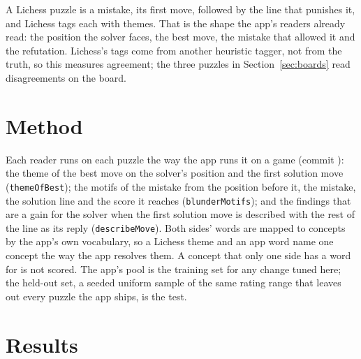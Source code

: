 \documentclass[11pt]{article}
\begin{document}
A Lichess puzzle is a mistake, its first move, followed by the line that punishes it, and
Lichess tags each with themes. That is the shape the app's readers already read: the position
the solver faces, the best move, the mistake that allowed it and the refutation. Lichess's tags
come from another heuristic tagger, not from the truth, so this measures agreement; the three
puzzles in Section~\ref{sec:boards} read disagreements on the board.

\section{Method}

Each reader runs on each puzzle the way the app runs it on a game (commit
\texttt{\AppCommit}): the theme of the best move on the solver's position and the first
solution move (\texttt{themeOfBest}); the motifs of the mistake from the position before it,
the mistake, the solution line and the score it reaches (\texttt{blunderMotifs}); and the
findings that are a gain for the solver when the first solution move is described with the rest
of the line as its reply (\texttt{describeMove}). Both sides' words are mapped to concepts by the
app's own vocabulary, so a Lichess theme and an app word name one concept the way the app
resolves them. A concept that only one side has a word for is not scored. The app's pool is the
training set for any change tuned here; the held-out set, a seeded uniform sample of the same
rating range that leaves out every puzzle the app ships, is the test.

\section{Results}

\begin{table}[tbp]
\centering
\small
\TableBest
\caption{The misses deck's labeller (\texttt{themeOfBest}). Tagged: puzzles Lichess tags with
the concept; said: puzzles the reader names it on. Checkmate is said only for a mate in one.}
\end{table}

\begin{table}[tbp]
\centering
\small
\TableBlunder
\caption{The review scan's motifs (\texttt{blunderMotifs}). Checkmate is left out: the score
passed in decides it.}
\end{table}

\begin{table}[tbp]
\centering
\small
\TableMove
\caption{The move describer's gain findings (\texttt{describeMove}).}
\end{table}
\end{document}
